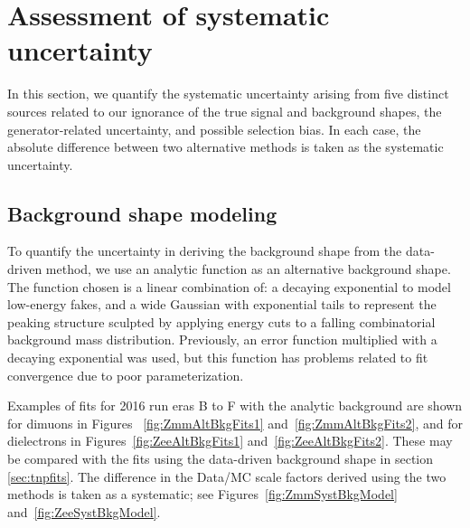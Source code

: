 \section{Assessment of systematic uncertainty}
\label{sec:tnpsyst}
In this section, we quantify the systematic uncertainty arising from five distinct sources related to our ignorance
of the true signal and background shapes, the generator-related uncertainty, and possible selection bias.
In each case, the absolute difference between two alternative methods is taken as the systematic uncertainty.
\subsection{Background shape modeling}
To quantify the uncertainty in deriving the background shape from the data-driven method,
we use an analytic function as an alternative background shape.
The function chosen is a linear combination of: a decaying exponential to model low-energy fakes,
and a wide Gaussian with exponential tails to represent the peaking structure
sculpted by applying energy cuts to a falling combinatorial background mass distribution.
Previously, an error function multiplied with a decaying exponential was used, but this function
has problems related to fit convergence due to poor parameterization.

Examples of fits for 2016 run eras B to F with the analytic background are shown for dimuons in
Figures ~\ref{fig:ZmmAltBkgFits1} and~\ref{fig:ZmmAltBkgFits2}, 
and for dielectrons in Figures~\ref{fig:ZeeAltBkgFits1} and~\ref{fig:ZeeAltBkgFits2}.
These may be compared with the fits using the data-driven background shape 
in section \ref{sec:tnpfits}.
The difference in the Data/MC scale factors derived using the two methods is taken as a systematic; 
see Figures~\ref{fig:ZmmSystBkgModel} and~\ref{fig:ZeeSystBkgModel}.

